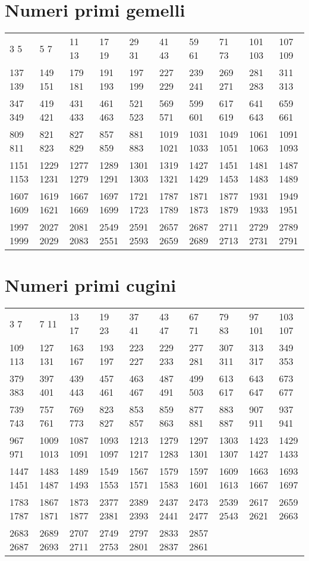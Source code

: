 \section{Numeri primi gemelli}
\label{sec:TabellaNumeriPrimigemelli}
\begin{center}
 \footnotesize
 \begin{tabular}{*{10}{l}}
 \toprule 
3 5&5 7&11 13&17 19&29 31&41 43&59 61&71 73&101 103&107 109\\
137 139&149 151&179 181&191 193&197 199&227 229&239 241&269 271&281 283&311 313\\
347 349&419 421&431 433&461 463&521 523&569 571&599 601&617 619&641 643&659 661\\
809 811&821 823&827 829&857 859&881 883&1019 1021&1031 1033&1049 1051&1061 1063&1091 1093\\
1151 1153&1229 1231&1277 1279&1289 1291&1301 1303&1319 1321&1427 1429&1451 1453&1481 1483&1487 1489\\
1607 1609&1619 1621&1667 1669&1697 1699&1721 1723&1787 1789&1871 1873&1877 1879&1931 1933&1949 1951\\
1997 1999&2027 2029&2081 2083&2549 2551&2591 2593&2657 2659&2687 2689&2711 2713&2729 2731&2789 2791\\
 \bottomrule
 \end{tabular}
\end{center}
\section{Numeri primi cugini}
\begin{center}
 \footnotesize
 \begin{tabular}{*{10}{l}}
  \toprule 
3 7&7 11&13 17&19 23&37 41&43 47&67 71&79 83&97 101&103 107\\
109 113&127 131&163 167&193 197&223 227&229 233&277 281&307 311&313 317&349 353\\
379 383&397 401&439 443&457 461&463 467&487 491&499 503&613 617&643 647&673 677\\
739 743&757 761&769 773&823 827&853 857&859 863&877 881&883 887&907 911&937 941\\
967 971&1009 1013&1087 1091&1093 1097&1213 1217&1279 1283&1297 1301&1303 1307&1423 1427&1429 1433\\
1447 1451&1483 1487&1489 1493&1549 1553&1567 1571&1579 1583&1597 1601&1609 1613&1663 1667&1693 1697\\
1783 1787&1867 1871&1873 1877&2377 2381&2389 2393&2437 2441&2473 2477&2539 2543&2617 2621&2659 2663\\
2683 2687&2689 2693&2707 2711&2749 2753&2797 2801&2833 2837&2857 2861\\
  \bottomrule
 \end{tabular}
\end{center}
